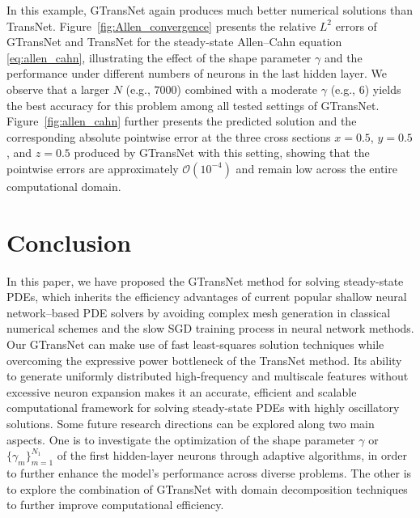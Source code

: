 \documentclass{article}
\begin{document}
In this example, GTransNet again produces much better numerical solutions than TransNet. Figure~\ref{fig:Allen_convergence} presents the relative $L^2$ errors of GTransNet and TransNet for the steady-state Allen–Cahn equation \eqref{eq:allen_cahn}, illustrating the effect of the shape parameter $\gamma$ and the performance under different numbers of neurons in the last hidden layer. We observe that a larger $N$ (e.g., $7000$) combined with a moderate $\gamma$ (e.g., $6$) yields the best accuracy for this problem among all tested settings of GTransNet.
Figure~\ref{fig:allen_cahn} further presents the predicted solution and the corresponding absolute pointwise error at the three cross sections $x = 0.5$, $y = 0.5$, and $z = 0.5$ produced by GTransNet with this setting, showing that the pointwise errors are approximately $\mathcal{O}(10^{-4})$ and remain low across the entire computational domain.


\section{Conclusion}\label{sec:5}
In this paper, we have proposed the GTransNet method for solving steady-state PDEs, which inherits the efficiency advantages of current popular shallow neural network–based PDE solvers by avoiding complex mesh generation in classical numerical schemes and the slow SGD training process in neural network methods. Our GTransNet can make use of fast least-squares solution techniques while overcoming the expressive power bottleneck of the TransNet method. Its ability to generate uniformly distributed high-frequency and multiscale features without excessive neuron expansion makes it an accurate, efficient and scalable computational framework for solving steady-state PDEs with  highly oscillatory solutions. Some future research directions can be explored along two main aspects. One is to investigate the optimization of the shape parameter $\gamma$ or $\{\gamma_m\}_{m=1}^{N_1}$ of the first hidden-layer neurons through adaptive algorithms, in order to further enhance the model’s performance across diverse problems. The other is to explore the combination of GTransNet with domain decomposition techniques to further improve computational efficiency.



\end{document}
